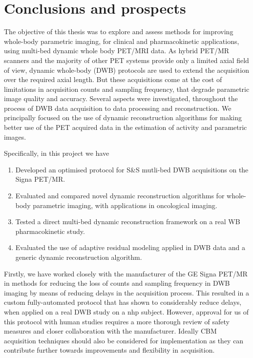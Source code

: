 \chapter*{Conclusions and prospects}
The objective of this thesis was to explore and assess methods for improving whole-body parametric imaging, for clinical and pharmacokinetic applications, using multi-bed dynamic whole body PET/MRI data.
As hybrid PET/MR scanners and the majority of other PET systems provide only a limited axial field of view, dynamic whole-body (DWB) protocols are used to extend the acquisition over the required axial length. But these acquisitions come at the cost of limitations in acquisition counts and sampling frequency, that degrade parametric image quality and accuracy.
Several aspects were investigated, throughout the process of DWB data acquisition to data processing and reconstruction. We principally focused on the use of dynamic reconstruction algorithms for making better use of the PET acquired data in the estimation of activity and parametric images.

Specifically, in this project we have
\begin{enumerate}
\item Developed an optimised protocol for S\&S mutli-bed DWB acquisitions on the Signa PET/MR.
\item Evaluated and compared novel dynamic reconstruction algorithms for whole-body parametric imaging, with applications in oncological imaging.
\item Tested a direct multi-bed dynamic reconstruction framework on a real WB pharmacokinetic study.
\item Evaluated the use of adaptive residual modeling applied in DWB data and a generic dynamic reconstruction algorithm.
\end{enumerate}

Firstly, we have worked closely with the manufacturer of the GE Signa PET/MR in methods for reducing the loss of counts and sampling frequency in DWB imaging by means of reducing delays in the acquisition process. This resulted in a custom fully-automated protocol that has shown to considerably reduce delays, when applied on a real DWB study on a \gls{nhp} subject. However, approval for us of this protocol with human studies requires a more thorough review of safety measures and closer collaboration with the manufacturer. Ideally CBM acquisition techniques should also be considered for implementation as they can contribute further towards improvements and flexibility in acquisition. 

